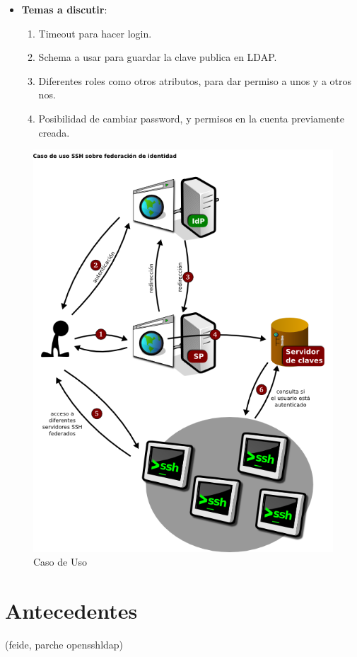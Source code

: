 \begin{itemize}
    \item \textbf{Temas a discutir}:

    \begin{enumerate}
        \item Timeout para hacer login.

        \item Schema a usar para guardar la clave publica en LDAP.

        \item Diferentes roles como otros atributos, para dar permiso a unos y a
        otros nos.

        \item Posibilidad de cambiar password, y permisos en la cuenta previamente
        creada.
    \end{enumerate}

    \end{itemize}


    \begin{figure}[htp!]
        \centering
            \includegraphics[width=\textwidth]{img/casodeuso1.png}
            \caption{Caso de Uso}
        \label{fig:casodeuso}
    \end{figure}


\section{Antecedentes}
    (feide, parche opensshldap)


